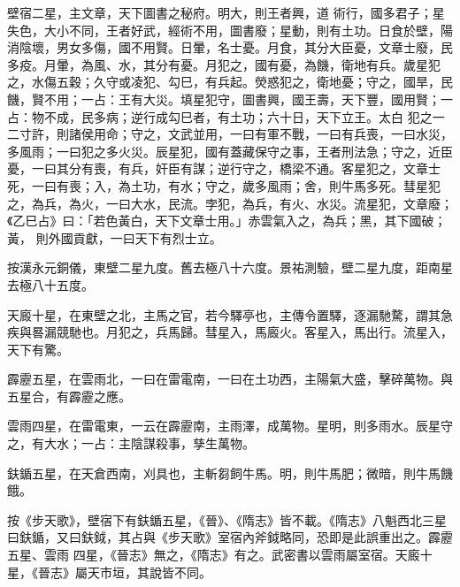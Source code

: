 \begin{pinyinscope}
 壁宿二星，主文章，天下圖書之秘府。明大，則王者興，道
 術行，國多君子；星失色，大小不同，王者好武，經術不用，圖書廢；星動，則有土功。日食於壁，陽消陰壞，男女多傷，國不用賢。日暈，名士憂。月食，其分大臣憂，文章士廢，民多疫。月暈，為風、水，其分有憂。月犯之，國有憂，為饑，衛地有兵。歲星犯之，水傷五穀；久守或凌犯、勾巳，有兵起。熒惑犯之，衛地憂；守之，國旱，民饑，賢不用；一占：王有大災。填星犯守，圖書興，國王壽，天下豐，國用賢；一占：物不成，民多病；逆行成勾巳者，有土功；六十日，天下立王。太白
 犯之一二寸許，則諸侯用命；守之，文武並用，一曰有軍不戰，一曰有兵喪，一曰水災，多風雨；一曰犯之多火災。辰星犯，國有蓋藏保守之事，王者刑法急；守之，近臣憂，一曰其分有喪，有兵，奸臣有謀；逆行守之，橋梁不通。客星犯之，文章士死，一曰有喪；入，為土功，有水；守之，歲多風雨；舍，則牛馬多死。彗星犯之，為兵，為火，一曰大水，民流。孛犯，為兵，有火、水災。流星犯，文章廢；《乙巳占》曰：「若色黃白，天下文章士用。」赤雲氣入之，為兵；黑，其下國破；黃，
 則外國貢獻，一曰天下有烈士立。



 按漢永元銅儀，東壁二星九度。舊去極八十六度。景祐測驗，壁二星九度，距南星去極八十五度。



 天廄十星，在東壁之北，主馬之官，若今驛亭也，主傳令置驛，逐漏馳騖，謂其急疾與晷漏競馳也。月犯之，兵馬歸。彗星入，馬廄火。客星入，馬出行。流星入，天下有驚。



 霹靂五星，在雲雨北，一曰在雷電南，一曰在土功西，主陽氣大盛，擊碎萬物。與五星合，有霹靂之應。



 雲雨四星，在雷電東，一云在霹靂南，主雨澤，成萬物。星明，則多雨水。辰星守之，有大水；一占：主陰謀殺事，孳生萬物。



 鈇鍎五星，在天倉西南，刈具也，主斬芻飼牛馬。明，則牛馬肥；微暗，則牛馬饑餓。



 按《步天歌》，壁宿下有鈇鍎五星，《晉》、《隋志》皆不載。《隋志》八魁西北三星曰鈇鍎，又曰鈇鉞，其占與《步天歌》室宿內斧鉞略同，恐即是此誤重出之。霹靂五星、雲雨
 四星，《晉志》無之，《隋志》有之。武密書以雲雨屬室宿。天廄十星，《晉志》屬天市垣，其說皆不同。



\end{pinyinscope}